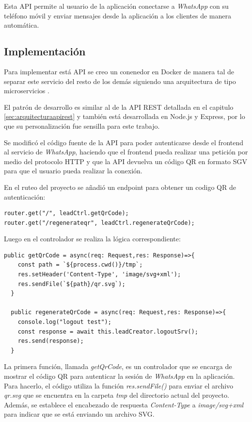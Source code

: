 Esta API permite al usuario de la aplicación conectarse a \textit{WhatsApp} con su teléfono móvil y enviar mensajes desde la aplicación a los clientes de manera automática.

\subsection{Implementación}
\label{subsec:apimessengerimplementación}

Para implementar está API se creo un conenedor en Docker de manera tal de separar este servicio del resto de los demás siguiendo una arquitectura de tipo microservicios \cite{microservices-docs}.

El patrón de desarrollo es similar al de la API REST detallada en el capitulo \ref{sec:arquitecturaapirest} y también está desarrollada en Node.js y Express, por lo que su personalización fue sensilla para este trabajo.

Se modificó el código fuente de la API para poder autenticarse desde el frontend al servicio de \textit{WhatsApp}, haciendo que el frontend pueda realizar una petición por medio del protocolo HTTP y que la API devuelva un código QR \cite{qr-code} en formato SGV \cite{svg-format} para que el usuario pueda realizar la conexión. 

En el ruteo del proyecto se añadió un endpoint para obtener un codigo QR de autenticación:

\begin{lstlisting}[label=cod:apimessengerroute,caption=Endpoint para obtener código QR.]
router.get("/", leadCtrl.getQrCode);
router.get("/regenerateqr", leadCtrl.regenerateQrCode);
\end{lstlisting}

Luego en el controlador se realiza la lógica correspondiente:

\begin{lstlisting}[label=cod:apimessengercontroller,caption=Controlador de ruta para obtener código QR.]
  public getQrCode = async(req: Request,res: Response)=>{
    const path = `${process.cwd()}/tmp`;
    res.setHeader('Content-Type', 'image/svg+xml');
    res.sendFile(`${path}/qr.svg`);
  }

  public regenerateQrCode = async(req: Request,res: Response)=>{
    console.log("logout test");
    const response = await this.leadCreator.logoutSrv();
    res.send(response);
  }
\end{lstlisting}

La primera función, llamada \textit{getQrCode}, es un controlador que se encarga de mostrar el código QR para autenticar la sesión de \textit{WhatsApp} en la aplicación. Para hacerlo, el código utiliza la función \textit{res.sendFile()} para enviar el archivo \textit{qr.svg} que se encuentra en la carpeta \textit{tmp} del directorio actual del proyecto. Además, se establece el encabezado de respuesta \textit{Content-Type} a \textit{image/svg+xml} para indicar que se está enviando un archivo SVG.

